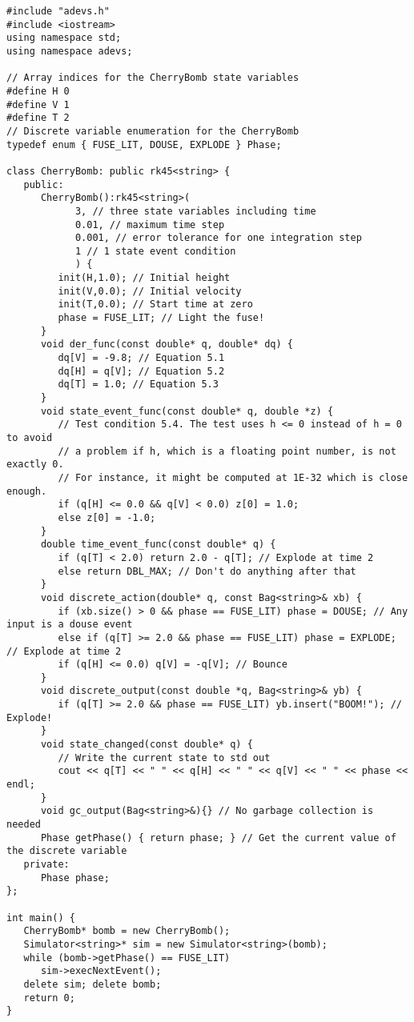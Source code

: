 \begin{verbatim}
#include "adevs.h"
#include <iostream>
using namespace std;
using namespace adevs;

// Array indices for the CherryBomb state variables
#define H 0
#define V 1
#define T 2
// Discrete variable enumeration for the CherryBomb
typedef enum { FUSE_LIT, DOUSE, EXPLODE } Phase;

class CherryBomb: public rk45<string> {
   public:
      CherryBomb():rk45<string>(
            3, // three state variables including time
            0.01, // maximum time step
            0.001, // error tolerance for one integration step
            1 // 1 state event condition
            ) {
         init(H,1.0); // Initial height
         init(V,0.0); // Initial velocity
         init(T,0.0); // Start time at zero
         phase = FUSE_LIT; // Light the fuse!
      }
      void der_func(const double* q, double* dq) {
         dq[V] = -9.8; // Equation 5.1
         dq[H] = q[V]; // Equation 5.2
         dq[T] = 1.0; // Equation 5.3
      }
      void state_event_func(const double* q, double *z) {
         // Test condition 5.4. The test uses h <= 0 instead of h = 0 to avoid
         // a problem if h, which is a floating point number, is not exactly 0.
         // For instance, it might be computed at 1E-32 which is close enough.
         if (q[H] <= 0.0 && q[V] < 0.0) z[0] = 1.0;
         else z[0] = -1.0;
      }
      double time_event_func(const double* q) {
         if (q[T] < 2.0) return 2.0 - q[T]; // Explode at time 2
         else return DBL_MAX; // Don't do anything after that
      }
      void discrete_action(double* q, const Bag<string>& xb) {
         if (xb.size() > 0 && phase == FUSE_LIT) phase = DOUSE; // Any input is a douse event
         else if (q[T] >= 2.0 && phase == FUSE_LIT) phase = EXPLODE; // Explode at time 2
         if (q[H] <= 0.0) q[V] = -q[V]; // Bounce
      }
      void discrete_output(const double *q, Bag<string>& yb) {
         if (q[T] >= 2.0 && phase == FUSE_LIT) yb.insert("BOOM!"); // Explode!
      }
      void state_changed(const double* q) {
         // Write the current state to std out
         cout << q[T] << " " << q[H] << " " << q[V] << " " << phase << endl;
      }
      void gc_output(Bag<string>&){} // No garbage collection is needed
      Phase getPhase() { return phase; } // Get the current value of the discrete variable
   private:
      Phase phase;
};

int main() {
   CherryBomb* bomb = new CherryBomb();
   Simulator<string>* sim = new Simulator<string>(bomb);
   while (bomb->getPhase() == FUSE_LIT)
      sim->execNextEvent();
   delete sim; delete bomb;
   return 0;
}
\end{verbatim}

